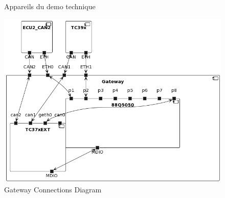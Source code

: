 \begin{figure}[!htb]
    \centering
    \caption{Appareils du demo technique}
    \label{fig:devices-diagram}
\end{figure}


\begin{figure}[!htb]
 \centering
 \includegraphics[width=\textwidth]{img/GWConnectionsDiagram.png}
 \caption{Gateway Connections Diagram}
 \label{fig:connections-diagram}
\end{figure}

